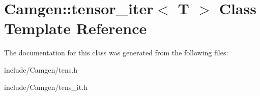 \hypertarget{a00543}{}\section{Camgen\+:\+:tensor\+\_\+iter$<$ T $>$ Class Template Reference}
\label{a00543}


The documentation for this class was generated from the following files\+:\begin{DoxyCompactItemize}
\item 
include/\+Camgen/tens.\+h\item 
include/\+Camgen/tens\+\_\+it.\+h\end{DoxyCompactItemize}
